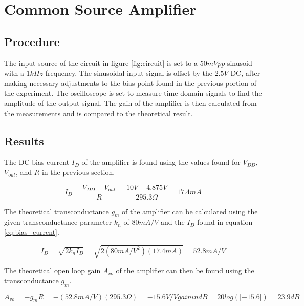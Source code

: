 \section{Common Source Amplifier}

\subsection{Procedure}

The input source of the circuit in figure \ref{fig:circuit} is set to a $50 mVpp$ sinusoid with a $1 kHz$ frequency.
The sinusoidal input signal is offset by the $2.5 V$ DC, after making necessary adjustments to the bias point found in the previous portion of the experiment.
The oscilloscope is set to measure time-domain signals to find the amplitude of the output signal.
The gain of the amplifier is then calculated from the measurements and is compared to the theoretical result.

\FloatBarrier

\subsection{Results}

The DC bias current $I_D$ of the amplifier is found using the values found for $V_{DD}$, $V_{out}$, and $R$ in the previous section.

\FloatBarrier

\begin{equation}
	\label{eq:bias_current}
	I_D = \frac{V_{DD}-V_{out}}{R} = \frac{10 V - 4.875 V}{295.3 \Omega} = 17.4 mA
\end{equation}

\FloatBarrier

The theoretical transconductance $g_m$ of the amplifier can be calculated using the given transconductance parameter $k_n$ of $80 mA/V$ and the $I_D$ found in equation \ref{eq:bias_current}.

\FloatBarrier

\begin{equation}
	\label{eq:g_m}
	I_D = \sqrt{2k_nI_D} = \sqrt{2(80 mA/V^2)(17.4 mA)} = 52.8 mA/V
\end{equation}

\FloatBarrier

The theoretical open loop gain $A_{vo}$ of the amplifier can then be found using the transconductance $g_m$.

\FloatBarrier

\begin{equation}
	\label{eq:theoretical_gain}
	A_{vo} = -g_mR = -(52.8 mA/V)(295.3 \Omega) = -15.6 V/V
    gain in dB = 20 log(|-15.6|) = 23.9 dB
\end{equation}

